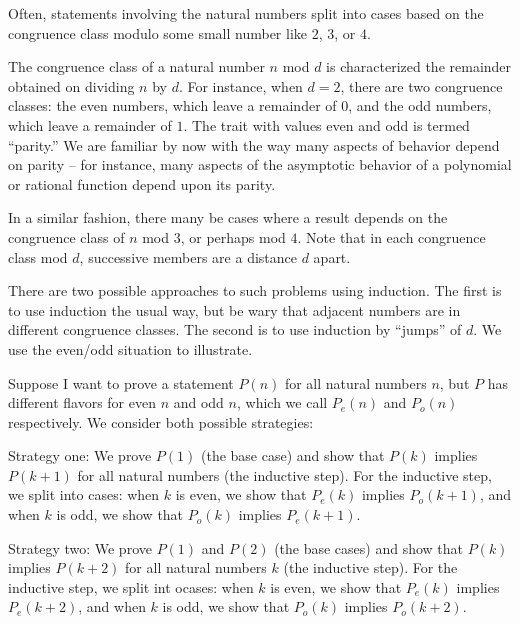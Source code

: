 \documentclass{amsart}
\begin{document}
Often, statements involving the natural numbers split into cases based
on the congruence class modulo some small number like $2$, $3$, or
$4$.

The congruence class of a natural number $n$ mod $d$ is characterized
the remainder obtained on dividing $n$ by $d$. For instance, when $d =
2$, there are two congruence classes: the even numbers, which leave a
remainder of $0$, and the odd numbers, which leave a remainder of
$1$. The trait with values even and odd is termed ``parity.'' We are
familiar by now with the way many aspects of behavior depend on parity
-- for instance, many aspects of the asymptotic behavior of a
polynomial or rational function depend upon its parity.

In a similar fashion, there many be cases where a result depends on
the congruence class of $n$ mod $3$, or perhaps mod $4$. Note that in
each congruence class mod $d$, successive members are a distance $d$
apart.

There are two possible approaches to such problems using
induction. The first is to use induction the usual way, but be wary
that adjacent numbers are in different congruence classes. The second
is to use induction by ``jumps'' of $d$. We use the even/odd situation
to illustrate.

Suppose I want to prove a statement $P(n)$ for all natural numbers
$n$, but $P$ has different flavors for even $n$ and odd $n$, which we call
$P_e(n)$ and $P_o(n)$ respectively. We consider both possible strategies:

Strategy one: We prove $P(1)$ (the base case) and show that $P(k)$
implies $P(k+1)$ for all natural numbers (the inductive step). For the
inductive step, we split into cases: when $k$ is even, we show that $P_e(k)$
implies $P_o(k+1)$, and when $k$ is odd, we show that $P_o(k)$ implies
$P_e(k+1)$.

Strategy two: We prove $P(1)$ and $P(2)$ (the base cases) and show
that $P(k)$ implies $P(k+2)$ for all natural numbers $k$ (the
inductive step). For the inductive step, we split int ocases: when $k$
is even, we show that $P_e(k)$ implies $P_e(k+2)$, and when $k$ is
odd, we show that $P_o(k)$ implies $P_o(k+2)$.
\end{document}
